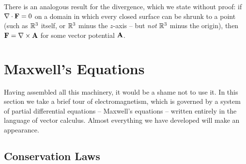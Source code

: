 \documentclass[a4paper]{scrartcl}
\begin{document}
\begin{center}
\end{center}

There is an analogous result for the divergence, which we state without proof: if $\nabla \cdot \mathbf{F} = 0$ on a domain in which every closed surface can be shrunk to a point (such as $\mathbb{R}^3$ itself, or $\mathbb{R}^3$ minus the $z$-axis -- but \emph{not} $\mathbb{R}^3$ minus the origin), then $\mathbf{F} = \nabla \times \mathbf{A}$ for some vector potential $\mathbf{A}$.
\section{Maxwell's Equations}

Having assembled all this machinery, it would be a shame not to use it. In this section we take a brief tour of electromagnetism, which is governed by a system of partial differential equations -- Maxwell's equations -- written entirely in the language of vector calculus. Almost everything we have developed will make an appearance.

\subsection{Conservation Laws}
\end{document}

